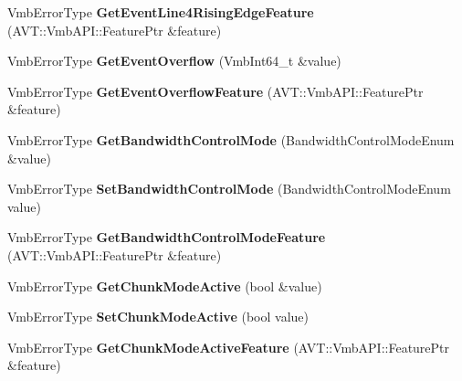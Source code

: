 \begin{DoxyCompactItemize}
\item 
\hypertarget{classMakoCamera_ae3d7d4ceac0ef4a69cde3bce9cfd9ffe}{Vmb\-Error\-Type {\bfseries Get\-Event\-Line4\-Rising\-Edge\-Feature} (A\-V\-T\-::\-Vmb\-A\-P\-I\-::\-Feature\-Ptr \&feature)}\label{classMakoCamera_ae3d7d4ceac0ef4a69cde3bce9cfd9ffe}

\item 
\hypertarget{classMakoCamera_a9252d9a75c71a0b49307c53e6958d6c6}{Vmb\-Error\-Type {\bfseries Get\-Event\-Overflow} (Vmb\-Int64\-\_\-t \&value)}\label{classMakoCamera_a9252d9a75c71a0b49307c53e6958d6c6}

\item 
\hypertarget{classMakoCamera_a1d3c7f87a249dfe91bc1969c9b3c3476}{Vmb\-Error\-Type {\bfseries Get\-Event\-Overflow\-Feature} (A\-V\-T\-::\-Vmb\-A\-P\-I\-::\-Feature\-Ptr \&feature)}\label{classMakoCamera_a1d3c7f87a249dfe91bc1969c9b3c3476}

\item 
\hypertarget{classMakoCamera_a0bc42e634f94f37bb2d28846e61656b9}{Vmb\-Error\-Type {\bfseries Get\-Bandwidth\-Control\-Mode} (Bandwidth\-Control\-Mode\-Enum \&value)}\label{classMakoCamera_a0bc42e634f94f37bb2d28846e61656b9}

\item 
\hypertarget{classMakoCamera_aca8b7e5f74319a61341e6d5817d4f1ec}{Vmb\-Error\-Type {\bfseries Set\-Bandwidth\-Control\-Mode} (Bandwidth\-Control\-Mode\-Enum value)}\label{classMakoCamera_aca8b7e5f74319a61341e6d5817d4f1ec}

\item 
\hypertarget{classMakoCamera_a5d148eb105b7e78248d1ec85426ca17b}{Vmb\-Error\-Type {\bfseries Get\-Bandwidth\-Control\-Mode\-Feature} (A\-V\-T\-::\-Vmb\-A\-P\-I\-::\-Feature\-Ptr \&feature)}\label{classMakoCamera_a5d148eb105b7e78248d1ec85426ca17b}

\item 
\hypertarget{classMakoCamera_a87c0591ac9cc2e06a647743134c0cf07}{Vmb\-Error\-Type {\bfseries Get\-Chunk\-Mode\-Active} (bool \&value)}\label{classMakoCamera_a87c0591ac9cc2e06a647743134c0cf07}

\item 
\hypertarget{classMakoCamera_a2bf6b605020c474ba6376fcf47be27a9}{Vmb\-Error\-Type {\bfseries Set\-Chunk\-Mode\-Active} (bool value)}\label{classMakoCamera_a2bf6b605020c474ba6376fcf47be27a9}

\item 
\hypertarget{classMakoCamera_a934987ae587c1b49ca3656e9781cc72f}{Vmb\-Error\-Type {\bfseries Get\-Chunk\-Mode\-Active\-Feature} (A\-V\-T\-::\-Vmb\-A\-P\-I\-::\-Feature\-Ptr \&feature)}\label{classMakoCamera_a934987ae587c1b49ca3656e9781cc72f}


\end{DoxyCompactItemize}
